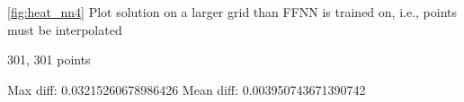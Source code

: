 \autoref{fig:heat_nn4} Plot solution on a larger grid than FFNN is trained on, i.e., points must be interpolated

301, 301 points

Max diff: 0.03215260678986426
Mean diff: 0.003950743671390742

\begin{figure}[H]
\centering
{}
\qquad
{}
\qquad

\end{figure}
